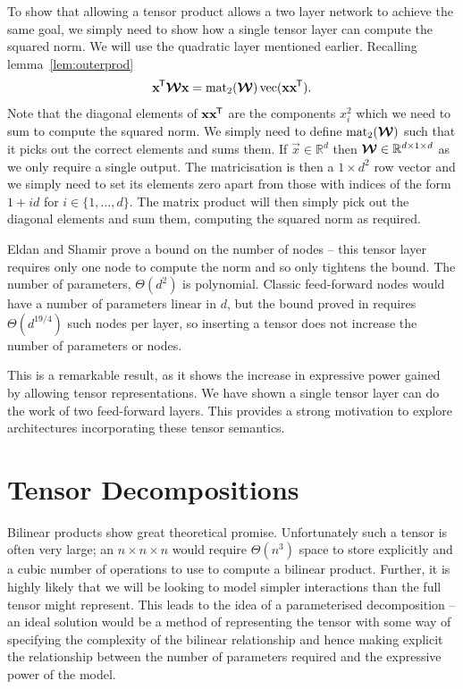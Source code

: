 To show that allowing a tensor product allows a two layer network to achieve the same goal, we
simply need to show how a single tensor layer can compute the squared norm. We will use the
quadratic layer mentioned earlier. Recalling lemma~\ref{lem:outerprod}
\begin{equation} \label{eq:outerquad}
	\mathbf{x}^{\mkern-1.5mu\mathsf{T}}\bm{\mathcal{W}}\mathbf{x} = \operatorname{mat}_2(\bm{\mathcal{W}}) \operatorname{vec}(\mathbf{x}\mathbf{x}^{\mkern-1.5mu\mathsf{T}}).
\end{equation} Note that the diagonal elements of \(\mathbf{x}\mathbf{x}^{\mkern-1.5mu\mathsf{T}}\) are the components
\(x_i^2\) which we need to sum to compute the squared norm. We simply need to define
\(\operatorname{mat}_2(\bm{\mathcal{W}})\) such that it picks out the correct elements and sums them. If 
\(\vec{x} \in \mathbb{R}^d\) then \(\bm{\mathcal{W}} \in \mathbb{R}^{d \times 1 \times d}\) as we only
require a single output. The matricisation is then a \(1 \times d^2\) row vector and we simply need
to set its elements zero apart from those with indices of the form \(1 + id\) for 
\(i \in \{1, \ldots, d\}\). The matrix product will then simply pick out the diagonal elements and
sum them, computing the squared norm as required.

Eldan and Shamir prove a bound on the number of nodes -- this tensor layer requires only one
node to compute the norm and so only tightens the bound. The number of parameters,
\(\Theta(d^2)\) is polynomial. Classic feed-forward nodes would have a number of parameters
linear in \(d\), but the bound proved in \autocite{Eldan2016} requires \(\Theta(d^{19/4})\) such
nodes per layer, so inserting a tensor does not increase the number of parameters or nodes.
 
This is a remarkable result, as it shows the increase in expressive power gained by allowing
tensor representations. We have shown a single tensor layer can do the work of two feed-forward
layers. This provides a strong motivation to explore architectures incorporating these tensor
semantics.


\section{Tensor Decompositions}
Bilinear products show great theoretical promise. Unfortunately
such a tensor is often very large; an \(n \times n \times n\) would require \(\Theta(n^3)\) space
to store explicitly and a cubic number of operations to use to compute a bilinear product. Further,
it is highly likely that we will be looking to model simpler interactions than the full tensor
might represent. This leads to the idea of a parameterised decomposition -- an ideal solution
would be a method of representing the tensor with some way of specifying the complexity of the
bilinear relationship and hence making explicit the relationship between the number of parameters
required and the expressive power of the model. 

